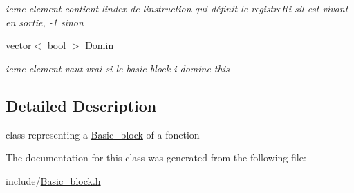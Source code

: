 \begin{DoxyCompactItemize}
\begin{DoxyCompactList}\small\item\em ieme element contient l\textquotesingle{}index de l\textquotesingle{}instruction qui définit le registre\+Ri s\textquotesingle{}il est vivant en sortie, -\/1 sinon \end{DoxyCompactList}\item 
\mbox{\label{class_basic__block_abca2350fc59a9bdb543fce63479c5c69}} 
vector$<$ bool $>$ \mbox{\hyperlink{class_basic__block_abca2350fc59a9bdb543fce63479c5c69}{Domin}}
\begin{DoxyCompactList}\small\item\em ieme element vaut vrai si le basic block i domine this \end{DoxyCompactList}\end{DoxyCompactItemize}


\subsection{Detailed Description}
class representing a \mbox{\hyperlink{class_basic__block}{Basic\+\_\+block}} of a fonction 

The documentation for this class was generated from the following file\+:\begin{DoxyCompactItemize}
\item 
include/\mbox{\hyperlink{_basic__block_8h}{Basic\+\_\+block.\+h}}\end{DoxyCompactItemize}
